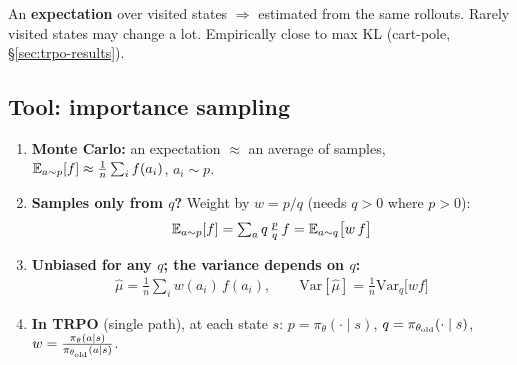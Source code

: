      {An \textbf{expectation} over visited states $\Rightarrow$ estimated from the same rollouts.}
     {Rarely visited states may change a lot. Empirically close to max KL (cart-pole, \S\ref{sec:trpo-results}).}

\subsection{Tool: importance sampling}
\label{sec:is-trpo}

\begin{enumerate}
  \item \textbf{Monte Carlo:} an expectation $\approx$ an average of samples, $\mathbb{E}_{a\sim p}[f]\approx\frac1n\sum_i f(a_i)$, $a_i\sim p$.
  \item \textbf{Samples only from $q$?} Weight by $w=p/q$ (needs $q>0$ where $p>0$):
  \begin{gather*}
    \mathbb{E}_{a\sim p}[f] = \textstyle\sum_a q\,\frac{p}{q}\,f = \mathbb{E}_{a\sim q}\big[w\,f\big]
  \end{gather*}
  \item \textbf{Unbiased for any $q$; the variance depends on $q$:}
  \begin{gather*}
    \hat\mu = \tfrac1n\textstyle\sum_{i} w(a_i)\,f(a_i), \qquad \mathrm{Var}[\hat\mu] = \tfrac1n\mathrm{Var}_{q}\big[w f\big]
  \end{gather*}
  \item \textbf{In TRPO} (single path), at each state $s$: $p=\pi_\theta(\cdot\mid s)$, $q=\pi_{\theta_{\mathrm{old}}}(\cdot\mid s)$, \ $w=\frac{\pi_\theta(a\mid s)}{\pi_{\theta_{\mathrm{old}}}(a\mid s)}$.
\end{enumerate}

